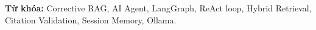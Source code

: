 \documentclass[12pt,a4paper,oneside]{report}
\begin{document}
\vspace{0.8cm}
\noindent\textbf{Từ khóa:} Corrective RAG, AI Agent, LangGraph, ReAct loop, Hybrid Retrieval, Citation Validation, Session Memory, Ollama.

\clearpage

\tableofcontents
\clearpage

\listoffigures
\clearpage

\listoftables
\clearpage

\setcounter{page}{1}








\label{LastPage}
\end{document}
